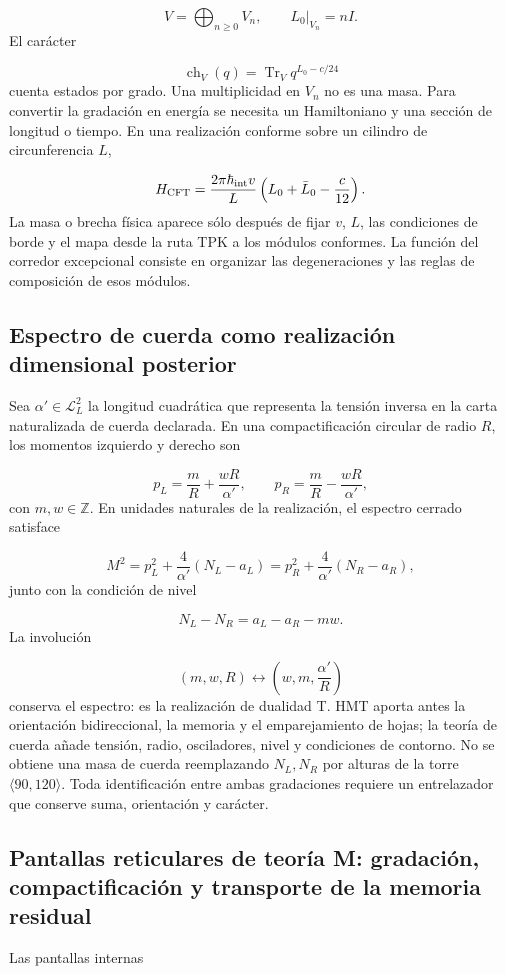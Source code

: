 \[
V=\bigoplus_{n\ge0}V_n,
\qquad
L_0|_{V_n}=nI.
\]
El carácter

\[
\operatorname{ch}_V(q)
=\operatorname{Tr}_V q^{L_0-c/24}
\]
cuenta estados por grado. Una multiplicidad en \(V_n\) no es una masa. Para convertir la gradación en energía se necesita un Hamiltoniano y una sección de longitud o tiempo. En una realización conforme sobre un cilindro de circunferencia \(L\),

\[
H_{\rm CFT}
=\frac{2\pi\hbar_{\rm int}v}{L}
\left(L_0+\bar L_0-\frac{c}{12}\right).
\]
La masa o brecha física aparece sólo después de fijar \(v\), \(L\), las condiciones de borde y el mapa desde la ruta TPK a los módulos conformes. La función del corredor excepcional consiste en organizar las degeneraciones y las reglas de composición de esos módulos.

\subsection{Espectro de cuerda como realización dimensional posterior}
Sea \(\alpha'\in\mathcal L_L^2\) la longitud cuadrática que representa la tensión inversa en la carta naturalizada de cuerda declarada. En una compactificación circular de radio \(R\), los momentos izquierdo y derecho son

\[
p_L=\frac{m}{R}+\frac{wR}{\alpha'},
\qquad
p_R=\frac{m}{R}-\frac{wR}{\alpha'},
\]
con \(m,w\in\mathbb Z\). En unidades naturales de la realización, el espectro cerrado satisface

\[
M^2=p_L^2+\frac{4}{\alpha'}(N_L-a_L)
=p_R^2+\frac{4}{\alpha'}(N_R-a_R),
\]
junto con la condición de nivel

\[
N_L-N_R=a_L-a_R-mw.
\]
La involución

\[
(m,w,R)\longleftrightarrow
\left(w,m,\frac{\alpha'}{R}\right)
\]
conserva el espectro: es la realización de dualidad T. HMT aporta antes la orientación bidireccional, la memoria y el emparejamiento de hojas; la teoría de cuerda añade tensión, radio, osciladores, nivel y condiciones de contorno. No se obtiene una masa de cuerda reemplazando \(N_L,N_R\) por alturas de la torre \(\langle90,120\rangle\). Toda identificación entre ambas gradaciones requiere un entrelazador que conserve suma, orientación y carácter.

\subsection{Pantallas reticulares de teoría M: gradación, compactificación y transporte de la memoria residual}
Las pantallas internas

